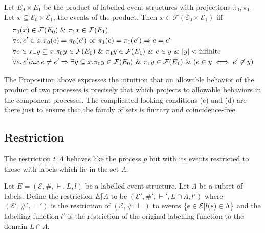 \documentclass{article}
\begin{document}
\begin{proposition}

    Let $E_0 \times E_1$ be the product of labelled event structures with projections
    $\pi_0,\pi_1$.
    Let $x \subseteq \mathcal{E}_0 \times \mathcal{E}_1$, the events of the product.
    Then $x \in \mathcal{F}(\mathcal{E}_0 \times \mathcal{E}_1)$ iff
    \begin{align*}
         & \pi_0(x)  \in \mathcal{F}(E_0) \ \& \  \pi_1x \in \mathcal{F}(E_1)                                      \\
         & \forall e,e' \in x.\pi_0(e)=\pi_0(e') \text{ or } \pi_1(e) = \pi_1(e') \Rightarrow e = e'            \\
         & \forall e \in x \exists y \subseteq x. \pi_0 y \in \mathcal{F}(E_0) \ \& \  \pi_1y \in \mathcal{F}(E_1)
        \ \& \  e \in y \ \& \  |y| < \text{infinite}                                                                 \\
         & \forall e,e' in x. e \neq e' \Rightarrow \exists y \subseteq x.\pi_0 y \in \mathcal{F}(E_0)
        \ \& \  \pi_1y \in \mathcal{F}(E_1) \ \& \  (e \in y \iff e' \not \in y)
    \end{align*}

\end{proposition}
The Proposition above expresses the intuition that an allowable behavior of the product
of two processes is precisely that which projects to allowable behaviors in the component
processes.
The complicated-looking conditions (c) and (d) are there just to ensure that the family
of sets is finitary and coincidence-free.

\subsection{Restriction}

The restriction $t \lceil \Lambda$ behaves like the process $p$ but with its events
restricted to those with labels which lie in the set $\Lambda$.

\begin{definition}

    Let $E = (\mathcal{E},\#,\vdash,L,l)$ be a labelled event structure.
    Let $\Lambda$ be a subset of labels.
    Define the restriction $E\lceil \Lambda$ to be $(\mathcal{E'},\#',\vdash',L\cap \Lambda,l')$
    where $(\mathcal{E'},\#',\vdash')$ is the restriction of $(\mathcal{E},\#,\vdash)$
    to events $\{e \in \mathcal{E}|l(e) \in \Lambda\}$ and the labelling function $l'$
    is the restriction of the original labelling function to the domain $L \cap \Lambda$.

\end{definition}
\end{document}
